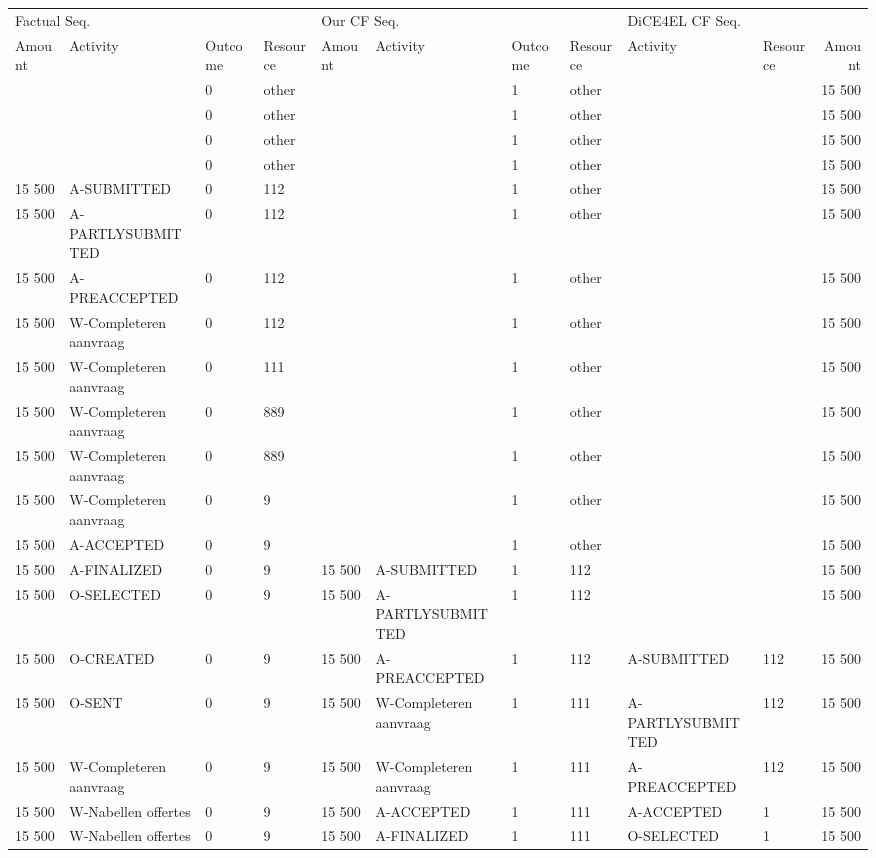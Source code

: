 \begin{tabular}{llllllllllr}
\toprule
\multicolumn{4}{l}{Factual Seq.} & \multicolumn{4}{l}{Our CF Seq.} & \multicolumn{3}{l}{DiCE4EL CF Seq.} \\
Amount & Activity & Outcome & Resource & Amount & Activity & Outcome & Resource & Activity & Resource & Amount \\
\midrule
 &  & 0 & other &  &  & 1 & other &  &  & 15 500 \\
 &  & 0 & other &  &  & 1 & other &  &  & 15 500 \\
 &  & 0 & other &  &  & 1 & other &  &  & 15 500 \\
 &  & 0 & other &  &  & 1 & other &  &  & 15 500 \\
15 500 & A-SUBMITTED & 0 & 112 &  &  & 1 & other &  &  & 15 500 \\
15 500 & A-PARTLYSUBMITTED & 0 & 112 &  &  & 1 & other &  &  & 15 500 \\
15 500 & A-PREACCEPTED & 0 & 112 &  &  & 1 & other &  &  & 15 500 \\
15 500 & W-Completeren aanvraag & 0 & 112 &  &  & 1 & other &  &  & 15 500 \\
15 500 & W-Completeren aanvraag & 0 & 111 &  &  & 1 & other &  &  & 15 500 \\
15 500 & W-Completeren aanvraag & 0 & 889 &  &  & 1 & other &  &  & 15 500 \\
15 500 & W-Completeren aanvraag & 0 & 889 &  &  & 1 & other &  &  & 15 500 \\
15 500 & W-Completeren aanvraag & 0 & 9 &  &  & 1 & other &  &  & 15 500 \\
15 500 & A-ACCEPTED & 0 & 9 &  &  & 1 & other &  &  & 15 500 \\
15 500 & A-FINALIZED & 0 & 9 & 15 500 & A-SUBMITTED & 1 & 112 &  &  & 15 500 \\
15 500 & O-SELECTED & 0 & 9 & 15 500 & A-PARTLYSUBMITTED & 1 & 112 &  &  & 15 500 \\
15 500 & O-CREATED & 0 & 9 & 15 500 & A-PREACCEPTED & 1 & 112 & A-SUBMITTED & 112 & 15 500 \\
15 500 & O-SENT & 0 & 9 & 15 500 & W-Completeren aanvraag & 1 & 111 & A-PARTLYSUBMITTED & 112 & 15 500 \\
15 500 & W-Completeren aanvraag & 0 & 9 & 15 500 & W-Completeren aanvraag & 1 & 111 & A-PREACCEPTED & 112 & 15 500 \\
15 500 & W-Nabellen offertes & 0 & 9 & 15 500 & A-ACCEPTED & 1 & 111 & A-ACCEPTED & 1 & 15 500 \\
15 500 & W-Nabellen offertes & 0 & 9 & 15 500 & A-FINALIZED & 1 & 111 & O-SELECTED & 1 & 15 500 \\

\end{tabular}
